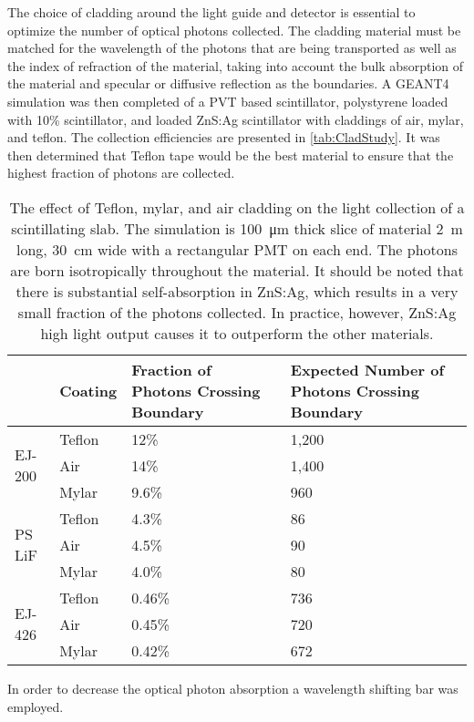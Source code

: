 The choice of cladding around the light guide and detector is essential to optimize the number of optical photons collected.
The cladding material must be matched for the wavelength of the photons that are being transported as well as the index of refraction of the material, taking into account the bulk absorption of the material and specular or diffusive reflection as the boundaries.
A GEANT4 simulation was then completed of a PVT based scintillator, polystyrene loaded with 10\%  scintillator, and  loaded ZnS:Ag scintillator with claddings of air, mylar, and teflon.
The collection efficiencies are presented in \autoref{tab:CladStudy}.
It was then determined that Teflon tape would be the best material to ensure that the highest fraction of photons are collected.
\begin{table}
  \caption[Teflon, Mylar, and HDPE Cladding Light Collection Effect]{The effect of Teflon, mylar, and air cladding on the light collection of a scintillating slab. The simulation is \SI{100}{\um} thick slice of material \SI{2}{\m} long, \SI{30}{\cm} wide with a rectangular PMT on each end. The photons are born isotropically throughout the material. It should be noted that there is substantial self-absorption in ZnS:Ag, which results in a very small fraction of the photons collected. In practice, however, ZnS:Ag high light output causes it to outperform the other materials.}
  \label{tab:CladStudy}
  \begin{tabular}{p{2.25cm} m{2.25cm} m{4cm} m{4cm}}
  \toprule
  & Coating & Fraction of Photons Crossing Boundary & Expected Number of Photons Crossing Boundary \\
  \midrule 
  \multirow{3}{*}{EJ-200} & Teflon & 12\% & 1,200\\
  				      & Air &  14\% & 1,400\\
				      & Mylar & 9.6\% & 960\\
  \midrule 
  \multirow{3}{*}{PS LiF} & Teflon & 4.3\% & 86\\
  				      & Air & 4.5\% & 90\\
				      & Mylar & 4.0\% & 80\\
  \midrule 
  \multirow{3}{*}{EJ-426} & Teflon & 0.46\% &736\\
  				      & Air & 0.45\% & 720\\
				      & Mylar & 0.42\% & 672 \\
 \bottomrule				 	   				  
 \end{tabular}
\end{table}
In order to decrease the optical photon absorption a wavelength shifting bar was employed.
